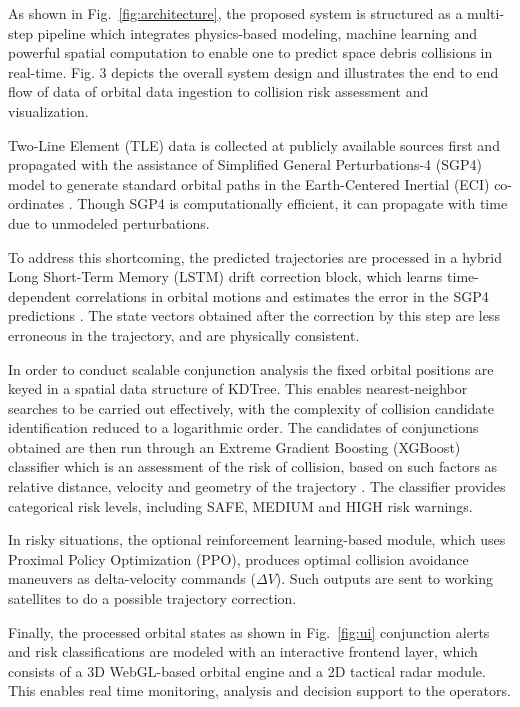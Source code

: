 \documentclass{ieeeaccess}
\begin{document}
As shown in Fig.~\ref{fig:architecture}, the proposed system is structured as a multi-step pipeline which integrates physics-based modeling, machine learning and powerful spatial computation to enable one to predict space debris collisions in real-time. Fig. 3 depicts the overall system design and illustrates the end to end flow of data of orbital data ingestion to collision risk assessment and visualization.

Two-Line Element (TLE) data is collected at publicly available sources first and propagated with the assistance of Simplified General Perturbations-4 (SGP4) model to generate standard orbital paths in the Earth-Centered Inertial (ECI) co-ordinates \cite{b6}. Though SGP4 is computationally efficient, it can propagate with time due to unmodeled perturbations.

To address this shortcoming, the predicted trajectories are processed in a hybrid Long Short-Term Memory (LSTM) drift correction block, which learns time-dependent correlations in orbital motions and estimates the error in the SGP4 predictions \cite{b7}. The state vectors obtained after the correction by this step are less erroneous in the trajectory, and are physically consistent.

In order to conduct scalable conjunction analysis the fixed orbital positions are keyed in a spatial data structure of KDTree. This enables nearest-neighbor searches to be carried out effectively, with the complexity of collision candidate identification reduced to a logarithmic order. The candidates of conjunctions obtained are then run through an Extreme Gradient Boosting (XGBoost) classifier which is an assessment of the risk of collision, based on such factors as relative distance, velocity and geometry of the trajectory \cite{b17}. The classifier provides categorical risk levels, including SAFE, MEDIUM and HIGH risk warnings.

In risky situations, the optional reinforcement learning-based module, which uses Proximal Policy Optimization (PPO), produces optimal collision avoidance maneuvers as delta-velocity commands ($\Delta V$). Such outputs are sent to working satellites to do a possible trajectory correction.

Finally, the processed orbital states as shown in Fig.~\ref{fig:ui} conjunction alerts and risk classifications are modeled with an interactive frontend layer, which consists of a 3D WebGL-based orbital engine and a 2D tactical radar module. This enables real time monitoring, analysis and decision support to the operators.
\end{document}
